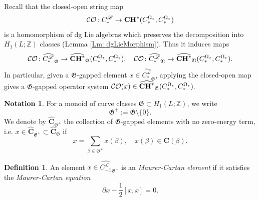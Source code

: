\documentclass[10pt]{amsart}
\numberwithin{equation}{section}
\theoremstyle{plain}
\theoremstyle{definition}
\newtheorem{definition}[theorem]{Definition}
\newtheorem{notation}[theorem]{Notation}
\theoremstyle{remark}
\numberwithin{equation}{section}
\newcommand{\Z}{\mathbb{Z}}
\newcommand{\wh}[1]{\widehat{#1}}
\newcommand{\mf}[1]{\mathfrak{#1}}
\newcommand{\CO}{\mathcal{CO}}
\newcommand{\CC}{\textbf{\textup{CH}}}
\newcommand{\CFr}{C_*^\mathscr{L}}
\newcommand{\CBa}{C_*^{\Omega_\star}}
\newcommand{\Cfr}[1]{C_{#1}^\mathscr{L}}
\begin{document}
{\bigskip

Recall that the closed-open string map \[ \CO \colon \CFr \to \CC^*(\CBa,\CBa) \]
is a homomorphism of dg Lie algebras which preserves the decomposition into $H_1(L;\Z)$ classes (Lemma \ref{Lm: dgLieMorphism}).
Thus it induces maps
\begin{align*}
	\CO\colon \wh{\CFr}_\mf{G}\to \wh{\CC^*}_\mf{G}(\CBa,\CBa),\quad \CO \colon \wh{\CFr}_\mf{N}\to \wh{\CC^*}_\mf{N}(\CBa,\CBa).
\end{align*}
In particular, given a $\mf{G}$-gapped element $x\in \wh{\CFr}_\mf{G}$, applying the closed-open map gives a $\mf{G}$-gapped operator system $\CO(x)\in \wh{\CC^*}_{\mf{G}}(\CBa,\CBa).$


\begin{notation}
	\label{Ntn: PositiveG}
	For a monoid of curve classes $\mf{G}\subset H_1(L;\Z)$, 
	we write \[\mf{G}^+:= \mf{G} \setminus \{0\}.\]
	We denote by $\wh{\mathbf{C}}_{\mf{G}^+}$ the collection of $\mf{G}$-gapped elements with no zero-energy term, i.e. $x\in \wh{\mathbf{C}}_{\mf{G}^+}\subset \wh{\mathbf{C}}_{\mf{G}}$  if \[ x = \sum_{\beta\in \mf{G}^+} x(\beta),\quad x(\beta)\in \mathbf{C}(\beta). \]
\end{notation}
\begin{definition}
	An element $x\in \wh{\Cfr{-1}}_{\mathfrak{G}^+}$ is an \emph{Maurer-Cartan element} if it satisfies the \emph{Maurer-Cartan equation}  \[ \partial  x - \frac{1}{2}[x,x ] = 0. \]
\end{definition}

}
\end{document}
